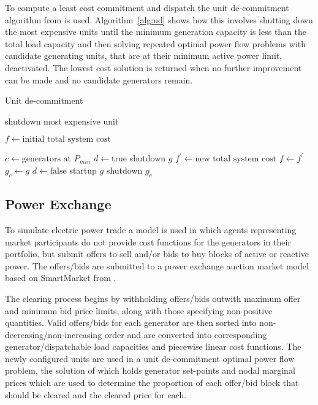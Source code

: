 To compute a least cost commitment and dispatch the unit de-commitment
algorithm from  is used.  Algorithm~\ref{alg:ud}
shows how this involves shutting down the most expensive units until the
minimum generation capacity is less than the total load capacity and then
solving repeated optimal power flow problems with candidate generating units,
that are at their minimum active power limit, deactivated.  The lowest cost
solution is returned when no further improvement can be made and no candidate
generators remain. \begin{algorithm}%
\caption{Unit de-commitment}
\label{alg:ud}
\begin{algorithmic}[1]
	\STATE shutdown most expensive unit
\ENDWHILE

\STATE $f \leftarrow \text{initial total system cost}$

\REPEAT
	\STATE $c \leftarrow \text{generators at } P_{min}$
		\STATE $d \leftarrow \text{true}$
		\STATE shutdown $g$
		\STATE $f^\prime \leftarrow \text{new total system cost}$
			\STATE $f \leftarrow f^\prime$
			\STATE $g_{c} \leftarrow g$
			\STATE $d \leftarrow \text{false}$
		\ENDIF
		\STATE startup $g$
	\ENDFOR
	\STATE shutdown $g_c$
\end{algorithmic}
\end{algorithm}

\subsection{Power Exchange}
To simulate electric power trade a model is used in which agents representing
market participants do not provide cost functions for the generators in their portfolio, but submit
offers to sell and/or bids to buy blocks of active or reactive power.  The
offers/bids are submitted to a power exchange auction market model based on
SmartMarket from .

The clearing process begins by withholding
offers/bids outwith maximum offer and minimum bid price limits, along with
those specifying non-positive quantities. Valid offers/bids for each generator
are then sorted into non-decreasing/non-increasing order and are converted
into corresponding generator/dispatchable load capacities and piecewise linear
cost functions. The newly configured units are used in a unit de-commitment
optimal power flow problem, the solution of which holds generator set-points
and nodal marginal prices which are used to determine the proportion of each
offer/bid block that should be cleared and the cleared price for each.


